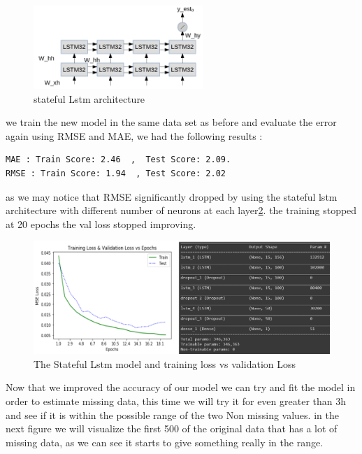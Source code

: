 \begin{figure}[h]
\centering
\includegraphics[width=0.57\textwidth]{img/stateful_stacked_lstm.png}  
\caption{stateful Lstm  architecture}
\label{}
\end{figure}
we train the new model in the same data set as before and evaluate the error again using RMSE and MAE, we had the following results :
\begin{verbatim}
MAE : Train Score: 2.46  ,  Test Score: 2.09.
RMSE : Train Score: 1.94  , Test Score: 2.02 
\end{verbatim}
as we may notice that RMSE significantly dropped by using the stateful lstm architecture with different  number of neurons at each layer\ref{stat_lstm}. the training stopped at 20 epochs the val loss stopped improving. 

\begin{figure}[h]
\centering
\includegraphics[width=1.05\textwidth]{img/lstm_stateful.png}  
\caption{The Stateful Lstm model and training loss vs validation Loss }
\label{stat_lstm}
\end{figure}
Now that we improved the accuracy of our model we can try and fit the model in order to estimate missing data, this time we will try it for even greater than 3h and see if it is within the possible range of the two Non missing values.
in the next figure we will visualize the first 500 of the original data that has a lot of missing data, as we can see it starts to give something really in the range.

